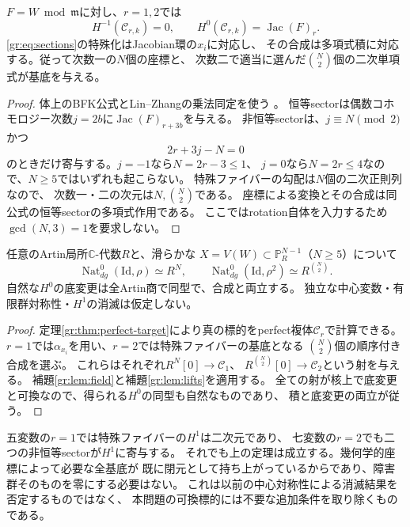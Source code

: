 \begin{lemma}[特殊ファイバーの低次数入力]\label{gr:lem:field}
$F=W\bmod\mathfrak m$に対し、$r=1,2$では
\[
 H^{-1}(\mathcal C_{r,k})=0,\qquad
 H^0(\mathcal C_{r,k})=\operatorname{Jac}(F)_r.
 \tag{GR6}\label{gr:eq:field}
\]
\eqref{gr:eq:sections}の特殊化はJacobian環の$x_i$に対応し、
その合成は多項式積に対応する。従って次数一の$N$個の座標と、
次数二で適当に選んだ$\binom N2$個の二次単項式が基底を与える。
\end{lemma}
\begin{proof}
体上のBFK公式とLin--Zhangの乗法同定を使う
\cite[Theorem~5.39]{GRBFK}\cite[Theorem~3.5, Remark~3.6, \S5]{GRLZ}。
恒等sectorは偶数コホモロジー次数$j=2b$に$\operatorname{Jac}(F)_{r+3b}$を与える。
非恒等sectorは、$j\equiv N\pmod2$かつ
\[
 2r+3j-N=0
\]
のときだけ寄与する。$j=-1$なら$N=2r-3\le1$、
$j=0$なら$N=2r\le4$なので、$N\ge5$ではいずれも起こらない。
特殊ファイバーの勾配は$N$個の二次正則列なので、
次数一・二の次元は$N,\binom N2$である。
座標による変換とその合成は同公式の恒等sectorの多項式作用である。
ここではrotation自体を入力するため$\gcd(N,3)=1$を要求しない。
\end{proof}

\begin{theorem}[全Artin低rotation底変更]\label{gr:thm:bc}
任意のArtin局所$\mathbb C$-代数$R$と、滑らかな
$X=V(W)\subset\mathbb P_R^{N-1}$（$N\ge5$）について
\[
 \operatorname{Nat}_{dg}^0(\mathrm{Id},\rho)\simeq R^N,
 \qquad
 \operatorname{Nat}_{dg}^0(\mathrm{Id},\rho^2)\simeq R^{\binom N2}.
 \tag{GR7}\label{gr:eq:ranks}
\]
自然な$H^0$の底変更は全Artin商で同型で、合成と両立する。
独立な中心変数・有限群対称性・$H^1$の消滅は仮定しない。
\end{theorem}
\begin{proof}
定理\ref{gr:thm:perfect-target}により真の標的をperfect複体$\mathcal C_r$で計算できる。
$r=1$では$\alpha_{x_i}$を用い、$r=2$では特殊ファイバーの基底となる
$\binom N2$個の順序付き合成を選ぶ。
これらはそれぞれ$R^N[0]\to\mathcal C_1$、
$R^{\binom N2}[0]\to\mathcal C_2$という射を与える。
補題\ref{gr:lem:field}と補題\ref{gr:lem:lifts}を適用する。
全ての射が核上で底変更と可換なので、得られる$H^0$の同型も自然なものであり、
積と底変更の両立が従う。
\end{proof}

\begin{remark}[障害群を消すより短い理由]
五変数の$r=1$では特殊ファイバーの$H^1$は二次元であり、
七変数の$r=2$でも二つの非恒等sectorが$H^1$に寄与する。
それでも上の定理は成立する。幾何学的座標によって必要な全基底が
既に閉元として持ち上がっているからであり、障害群そのものを零にする必要はない。
これは以前の中心対称性による消滅結果を否定するものではなく、
本問題の可換標的には不要な追加条件を取り除くものである。
\end{remark}

